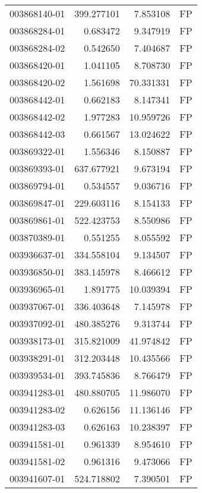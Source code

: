 \begin{tabular}{lrrl}
003868140-01 &  399.277101 &       7.853108 &   FP \\
003868284-01 &    0.683472 &       9.347919 &   FP \\
003868284-02 &    0.542650 &       7.404687 &   FP \\
003868420-01 &    1.041105 &       8.708730 &   FP \\
003868420-02 &    1.561698 &      70.331331 &   FP \\
003868442-01 &    0.662183 &       8.147341 &   FP \\
003868442-02 &    1.977283 &      10.959726 &   FP \\
003868442-03 &    0.661567 &      13.024622 &   FP \\
003869322-01 &    1.556346 &       8.150887 &   FP \\
003869393-01 &  637.677921 &       9.673194 &   FP \\
003869794-01 &    0.534557 &       9.036716 &   FP \\
003869847-01 &  229.603116 &       8.154133 &   FP \\
003869861-01 &  522.423753 &       8.550986 &   FP \\
003870389-01 &    0.551255 &       8.055592 &   FP \\
003936637-01 &  334.558104 &       9.134507 &   FP \\
003936850-01 &  383.145978 &       8.466612 &   FP \\
003936965-01 &    1.891775 &      10.039394 &   FP \\
003937067-01 &  336.403648 &       7.145978 &   FP \\
003937092-01 &  480.385276 &       9.313744 &   FP \\
003938173-01 &  315.821009 &      41.974842 &   FP \\
003938291-01 &  312.203448 &      10.435566 &   FP \\
003939534-01 &  393.745836 &       8.766479 &   FP \\
003941283-01 &  480.880705 &      11.986070 &   FP \\
003941283-02 &    0.626156 &      11.136146 &   FP \\
003941283-03 &    0.626163 &      10.238397 &   FP \\
003941581-01 &    0.961339 &       8.954610 &   FP \\
003941581-02 &    0.961316 &       9.473066 &   FP \\
003941607-01 &  524.718802 &       7.390501 &   FP \\

\end{tabular}
